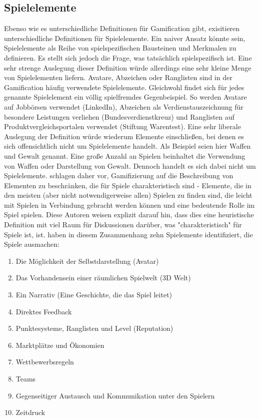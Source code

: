 \subsection{Spielelemente}\label{gamelelements}
Ebenso wie es unterschiedliche Definitionen für Gamification gibt, exisitieren unterschiedliche Definitionen für Spielelemente. Ein naiver Ansatz könnte sein, Spielelemente als Reihe von spielspezifischen Bausteinen und Merkmalen zu definieren. Es stellt sich jedoch die Frage, was tatsächlich spielspezifisch ist. Eine sehr strenge Auslegung dieser Definition würde allerdings eine sehr kleine Menge von Spielelementen liefern. Avatare, Abzeichen oder Ranglisten sind in der Gamification häufig verwendete Spielelemente. Gleichwohl findet sich für jedes genannte Spielelement ein völlig spielfremdes Gegenbeispiel. So werden Avatare auf Jobbörsen verwendet (LinkedIn), Abzeichen als Verdienstauszeichnung für besondere Leistungen verliehen (Bundesverdienstkreuz) und Ranglisten auf Produktvergleichsportalen verwendet (Stiftung Warentest). Eine sehr liberale Auslegung der Definition würde wiederum Elemente einschließen, bei denen es sich offensichtlich nicht um Spielelemente handelt. Als Beispiel seien hier Waffen und Gewalt genannt. Eine große Anzahl an Spielen beinhaltet die Verwendung von Waffen oder Darstellung von Gewalt. Dennoch handelt es sich dabei nicht um Spielelemente.  schlagen daher vor, Gamifizierung auf die Beschreibung von Elementen zu beschränken, die für Spiele charakteristisch sind - Elemente, die in den meisten (aber nicht notwendigerweise allen) Spielen zu finden sind, die leicht mit Spielen in Verbindung gebracht werden können und eine bedeutende Rolle im Spiel spielen. Diese Autoren weisen explizit darauf hin, dass dies eine heuristische Definition mit viel Raum für Diskussionen darüber, was "charakteristisch" für Spiele ist, ist.  haben in diesem Zusammenhang zehn Spielemente identifiziert, die  Spiele ausmachen:

\begin{enumerate}
  \item Die Möglichkeit der Selbstdarstellung (Avatar)
  \item Das Vorhandensein einer räumlichen Spielwelt (3D Welt)
  \item Ein Narrativ (Eine Geschichte, die das Spiel leitet)
  \item Direktes Feedback
  \item Punktesysteme, Ranglisten und Level (Reputation)
  \item Marktplätze und Ökonomien
  \item Wettbewerbsregeln 
  \item Teams
  \item Gegenseitiger Austausch und Kommunikation unter den Spielern
  \item Zeitdruck
\end{enumerate}

